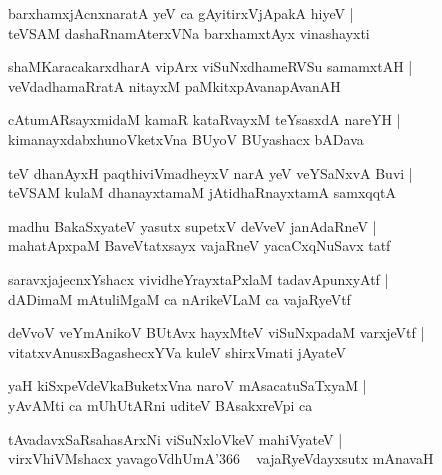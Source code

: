 \documentclass[twoside,12pt,openright]{book}
\newcounter{shloka}[chapter]
\begin{document}
\begin{shloka}%
barxhamxjAcnxnaratA yeV ca gAyitirxVjApakA hiyeV |\\
teVSAM dashaRnamAterxVNa barxhamxtAyx vinashayxti
\end{shloka}

\begin{shloka}%
shaMKaracakarxdharA vipArx viSuNxdhameRVSu samamxtAH |\\
veVdadhamaRratA nitayxM paMkitxpAvanapAvanAH
\end{shloka}

\begin{shloka}%
cAtumARsayxmidaM kamaR kataRvayxM teYsasxdA nareYH |\\
kimanayxdabxhunoVketxVna BUyoV BUyashacx bADava
\end{shloka}

\begin{shloka}%
teV dhanAyxH paqthiviVmadheyxV narA yeV veYSaNxvA Buvi |\\
teVSAM kulaM dhanayxtamaM jAtidhaRnayxtamA samxqqtA 
\end{shloka}

\begin{shloka}%
madhu BakaSxyateV yasutx supetxV deVveV janAdaRneV |\\
mahatApxpaM BaveVtatxsayx vajaRneV yacaCxqNuSavx tatf
\end{shloka}

\begin{shloka}%
saravxjajecnxYshacx vividheYrayxtaPxlaM tadavApunxyAtf |\\
dADimaM mAtuliMgaM ca nArikeVLaM ca vajaRyeVtf
\end{shloka}

\begin{shloka}%
deVvoV veYmAnikoV BUtAvx hayxMteV viSuNxpadaM varxjeVtf |\\
vitatxvAnusxBagashecxYVa kuleV shirxVmati jAyateV 
\end{shloka}

\begin{shloka}%
yaH kiSxpeVdeVkaBuketxVna naroV mAsacatuSaTxyaM |\\
yAvAMti ca mUhUtARni uditeV BAsakxreVpi ca 
\end{shloka}

\begin{shloka}%
tAvadavxSaRsahasArxNi viSuNxloVkeV mahiVyateV |\\
virxVhiVMshacx yavagoVdhUmA\char'366 ~ vajaRyeVdayxsutx mAnavaH 
\end{shloka}
\end{document}
